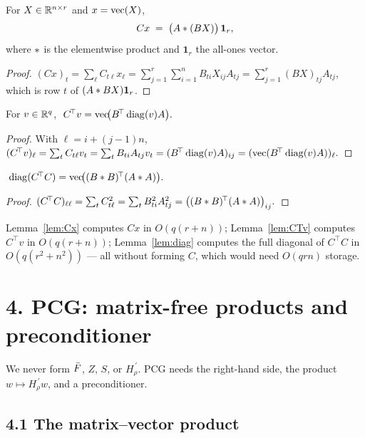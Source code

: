 \documentclass[11pt]{article}
\begin{document}
\begin{qtenlemma}\label{lem:Cx}
For $X\in\mathbb{R}^{n\times r}$ and $x=\operatorname{vec}(X)$,
\[
  Cx \;=\; \bigl(A\ast (BX)\bigr)\,\mathbf 1_r,
\]
where $\ast$ is the elementwise product and $\mathbf 1_r$ the all-ones vector.
\end{qtenlemma}
\begin{proof}
$(Cx)_t=\sum_{\ell}C_{t\ell}x_\ell=\sum_{j=1}^r\sum_{i=1}^n B_{ti}X_{ij}A_{tj}
 =\sum_{j=1}^r (BX)_{tj}A_{tj}$, which is row $t$ of $(A\ast BX)\mathbf 1_r$.
\end{proof}

\begin{qtenlemma}\label{lem:CTv}
For $v\in\mathbb{R}^q$, $\;C^{\!\top}v=\operatorname{vec}\!\bigl(B^{\!\top}\operatorname{diag}(v)A\bigr).$
\end{qtenlemma}
\begin{proof}
With $\ell=i+(j-1)n$,
$(C^{\!\top}v)_\ell=\sum_t C_{t\ell}v_t=\sum_t B_{ti}A_{tj}v_t
 =(B^{\!\top}\operatorname{diag}(v)A)_{ij}=(\operatorname{vec}(B^{\!\top}\operatorname{diag}(v)A))_\ell.$
\end{proof}

\begin{qtenlemma}\label{lem:diag}
$\;\operatorname{diag}(C^{\!\top}C)=\operatorname{vec}\!\bigl((B\ast B)^{\!\top}(A\ast A)\bigr).$
\end{qtenlemma}
\begin{proof}
$(C^{\!\top}C)_{\ell\ell}=\sum_t C_{t\ell}^2=\sum_t B_{ti}^2A_{tj}^2
 =\bigl((B\ast B)^{\!\top}(A\ast A)\bigr)_{ij}.$
\end{proof}

\noindent Lemma~\ref{lem:Cx} computes $Cx$ in $O(q(r+n))$; Lemma~\ref{lem:CTv}
computes $C^{\!\top}v$ in $O(q(r+n))$; Lemma~\ref{lem:diag} computes the full
diagonal of $C^{\!\top}C$ in $O(q(r^2+n^2))$ — all without forming $C$, which
would need $O(qrn)$ storage.

\section*{4. PCG: matrix-free products and preconditioner}

We never form $\bar F$, $Z$, $S$, or $H_\rho^{\,\prime}$. PCG needs the
right-hand side, the product $w\mapsto H_\rho^{\,\prime}w$, and a
preconditioner.

\subsection*{4.1 The matrix--vector product}
\end{document}
